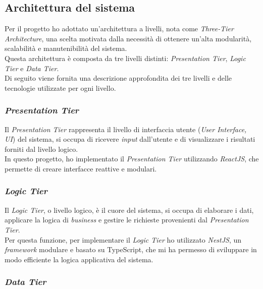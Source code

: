 \subsection{Architettura del sistema}
\label{subsec:architettura}

Per il progetto ho adottato un'architettura a livelli, nota come \textit{Three-Tier Architecture}, una scelta motivata dalla necessità di ottenere un'alta modularità, scalabilità e manutenibilità del sistema.\\
Questa architettura è composta da tre livelli distinti: \textit{Presentation Tier}, \textit{Logic Tier} e \textit{Data Tier}.\\

\noindent Di seguito viene fornita una descrizione approfondita dei tre livelli e delle tecnologie utilizzate per ogni livello.

\subsubsection{\textit{Presentation Tier}}

\noindent Il \textit{Presentation Tier} rappresenta il livello di interfaccia utente (\textit{User Interface, UI}) del sistema,
si occupa di ricevere \textit{input} dall'utente e di visualizzare i risultati forniti dal livello logico.\\
In questo progetto, ho implementato il \textit{Presentation Tier} utilizzando \textit{ReactJS}, che permette di creare interfacce reattive e modulari.

\subsubsection{\textit{Logic Tier}} 

\noindent Il \textit{Logic Tier}, o livello logico, è il cuore del sistema,
si occupa di elaborare i dati, applicare la logica di \textit{business} e gestire le richieste provenienti dal \textit{Presentation Tier}.\\
Per questa funzione, per implementare il \textit{Logic Tier} ho utilizzato \textit{NestJS}, un \textit{framework} modulare e basato su TypeScript, che mi ha permesso di sviluppare in modo efficiente la logica applicativa del sistema.

\subsubsection{\textit{Data Tier}} 

